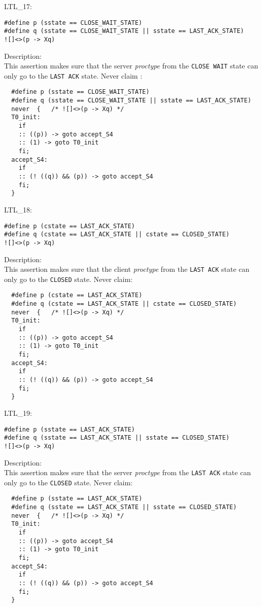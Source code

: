 \documentclass{WigReport}
\begin{document}
LTL\_17:\\
\begin{lstlisting}
#define p (sstate == CLOSE_WAIT_STATE)
#define q (sstate == CLOSE_WAIT_STATE || sstate == LAST_ACK_STATE)
![]<>(p -> Xq)
\end{lstlisting}
Description:\\
This assertion makes sure that the server \textit{proctype} from the
\verb|CLOSE WAIT| state can only go to the \verb|LAST ACK| state.
Never claim :\\
\begin{lstlisting}
  #define p (sstate == CLOSE_WAIT_STATE)
  #define q (sstate == CLOSE_WAIT_STATE || sstate == LAST_ACK_STATE)
  never  {   /* ![]<>(p -> Xq) */
  T0_init:
    if
    :: ((p)) -> goto accept_S4
    :: (1) -> goto T0_init
    fi;
  accept_S4:
    if
    :: (! ((q)) && (p)) -> goto accept_S4
    fi;
  }
\end{lstlisting}


LTL\_18:\\
\begin{lstlisting}
#define p (cstate == LAST_ACK_STATE)
#define q (cstate == LAST_ACK_STATE || cstate == CLOSED_STATE)
![]<>(p -> Xq)
\end{lstlisting}
Description:\\
This assertion makes sure that the client \textit{proctype} from the
\verb|LAST ACK| state can only go to the \verb|CLOSED| state.
Never claim:\\
\begin{lstlisting}
  #define p (cstate == LAST_ACK_STATE)
  #define q (cstate == LAST_ACK_STATE || cstate == CLOSED_STATE)
  never  {   /* ![]<>(p -> Xq) */
  T0_init:
    if
    :: ((p)) -> goto accept_S4
    :: (1) -> goto T0_init
    fi;
  accept_S4:
    if
    :: (! ((q)) && (p)) -> goto accept_S4
    fi;
  }
\end{lstlisting}


LTL\_19:\\
\begin{lstlisting}
#define p (sstate == LAST_ACK_STATE)
#define q (sstate == LAST_ACK_STATE || sstate == CLOSED_STATE)
![]<>(p -> Xq)
\end{lstlisting}
Description:\\
This assertion makes sure that the server \textit{proctype} from the
\verb|LAST ACK| state can only go to the \verb|CLOSED| state.
Never claim:\\
\begin{lstlisting}
  #define p (sstate == LAST_ACK_STATE)
  #define q (sstate == LAST_ACK_STATE || sstate == CLOSED_STATE)
  never  {   /* ![]<>(p -> Xq) */
  T0_init:
    if
    :: ((p)) -> goto accept_S4
    :: (1) -> goto T0_init
    fi;
  accept_S4:
    if
    :: (! ((q)) && (p)) -> goto accept_S4
    fi;
  }
\end{lstlisting}
\end{document}
